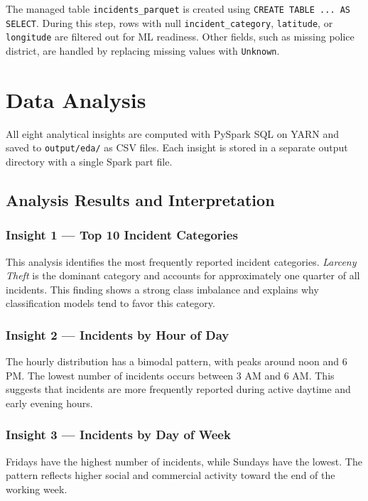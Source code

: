 \documentclass[12pt,a4paper]{article}
\begin{document}
The managed table \texttt{incidents\_parquet} is created using \texttt{CREATE TABLE ... AS SELECT}. During this step, rows with null \texttt{incident\_category}, \texttt{latitude}, or \texttt{longitude} are filtered out for ML readiness. Other fields, such as missing police district, are handled by replacing missing values with \texttt{Unknown}.

\section{Data Analysis}

All eight analytical insights are computed with PySpark SQL on YARN and saved to \texttt{output/eda/} as CSV files. Each insight is stored in a separate output directory with a single Spark part file.

\subsection{Analysis Results and Interpretation}

\subsubsection{Insight 1 --- Top 10 Incident Categories}

This analysis identifies the most frequently reported incident categories. \textit{Larceny Theft} is the dominant category and accounts for approximately one quarter of all incidents. This finding shows a strong class imbalance and explains why classification models tend to favor this category.

\subsubsection{Insight 2 --- Incidents by Hour of Day}

The hourly distribution has a bimodal pattern, with peaks around noon and 6 PM. The lowest number of incidents occurs between 3 AM and 6 AM. This suggests that incidents are more frequently reported during active daytime and early evening hours.

\subsubsection{Insight 3 --- Incidents by Day of Week}

Fridays have the highest number of incidents, while Sundays have the lowest. The pattern reflects higher social and commercial activity toward the end of the working week.
\end{document}
